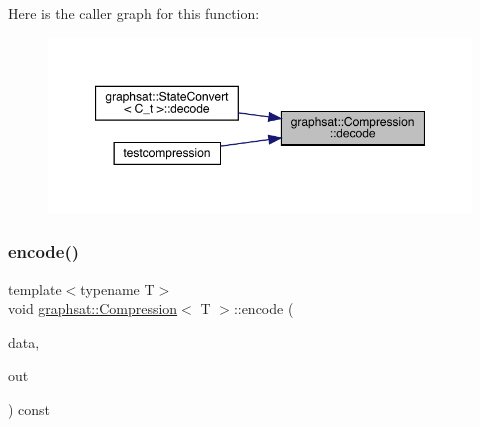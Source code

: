 Here is the caller graph for this function\+:
\nopagebreak
\begin{figure}[H]
\begin{center}
\leavevmode
\includegraphics[width=350pt]{classgraphsat_1_1_compression_a76b8dd8b2673ed317f179e145685e861_icgraph}
\end{center}
\end{figure}
\mbox{\label{classgraphsat_1_1_compression_acf45cee3c5c364552b6815f659687df9}} 
\subsubsection{\texorpdfstring{encode()}{encode()}}
{\footnotesize\ttfamily template$<$typename T$>$ \\
void \mbox{\hyperlink{classgraphsat_1_1_compression}{graphsat\+::\+Compression}}$<$ T $>$\+::encode (\begin{DoxyParamCaption}\item[{const T $\ast$const}]{data,  }\item[{\mbox{\hyperlink{namespacegraphsat_aa3b3d61a8c27ffc03448c5e1f3a76aed}{U\+I\+NT}} $\ast$}]{out }\end{DoxyParamCaption}) const\hspace{0.3cm}{\ttfamily [inline]}}

